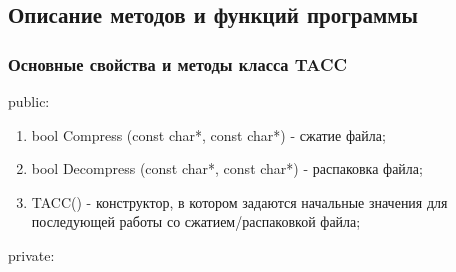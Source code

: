 \documentclass[12pt]{article}
\begin{document}
	\subsection*{Описание методов и функций программы}
	
	\subsubsection*{Основные свойства и методы класса TACC}
	\noindent
	public:
	
	\begin{enumerate}
		\item bool Compress (const char*, const char*) - сжатие файла;
		\item bool Decompress (const char*, const char*) - распаковка файла;
		\item TACC() - конструктор, в котором задаются начальные значения для последующей работы со сжатием/распаковкой файла;
	\end{enumerate}
	\noindent
	private:
	
\end{document}
